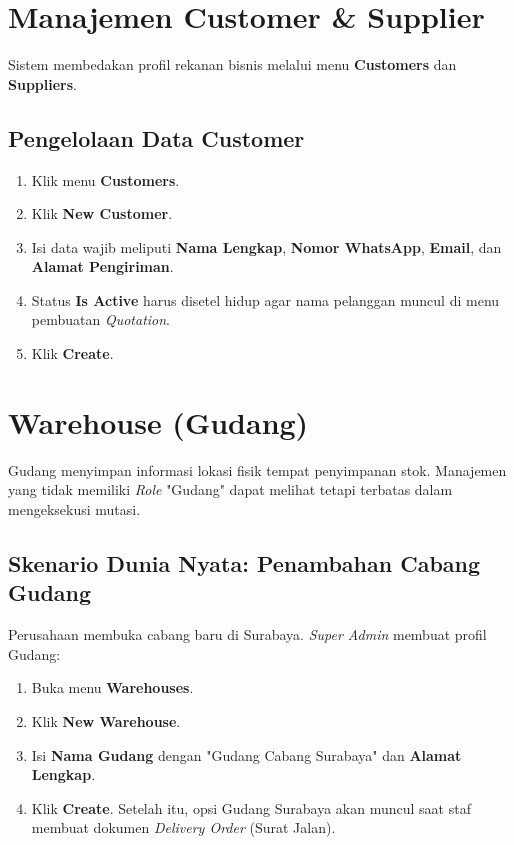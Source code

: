 \section{Manajemen Customer \& Supplier}

Sistem membedakan profil rekanan bisnis melalui menu \textbf{Customers} dan \textbf{Suppliers}.

\subsection{Pengelolaan Data Customer}
\begin{enumerate}
    \item Klik menu \textbf{Customers}.
    \item Klik \textbf{New Customer}.
    \item Isi data wajib meliputi \textbf{Nama Lengkap}, \textbf{Nomor WhatsApp}, \textbf{Email}, dan \textbf{Alamat Pengiriman}.
    \item Status \textbf{Is Active} harus disetel hidup agar nama pelanggan muncul di menu pembuatan \textit{Quotation}.
    \item Klik \textbf{Create}.
\end{enumerate}

\section{Warehouse (Gudang)}

Gudang menyimpan informasi lokasi fisik tempat penyimpanan stok. Manajemen yang tidak memiliki \textit{Role} "Gudang" dapat melihat tetapi terbatas dalam mengeksekusi mutasi.

\subsection{Skenario Dunia Nyata: Penambahan Cabang Gudang}
Perusahaan membuka cabang baru di Surabaya. \textit{Super Admin} membuat profil Gudang:
\begin{enumerate}
    \item Buka menu \textbf{Warehouses}.
    \item Klik \textbf{New Warehouse}.
    \item Isi \textbf{Nama Gudang} dengan "Gudang Cabang Surabaya" dan \textbf{Alamat Lengkap}.
    \item Klik \textbf{Create}. Setelah itu, opsi Gudang Surabaya akan muncul saat staf membuat dokumen \textit{Delivery Order} (Surat Jalan).
\end{enumerate}
